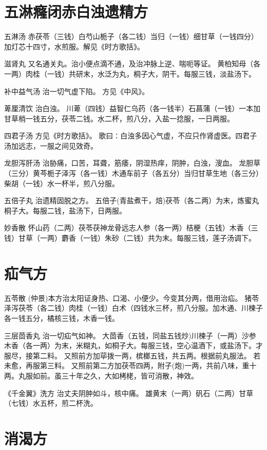 \documentclass[a4paper,12pt,UTF8,twoside]{ctexbook}
\begin{document}
	\chapter{五淋癃闭赤白浊遗精方}
	五淋汤
	赤茯苓（三钱）白芍山栀子（各二钱）当归（一钱）细甘草（一钱四分）加灯芯十四寸，水煎服。解见《时方歌括》。
	
	滋肾丸
	又名通关丸。治小便点滴不通，及治冲脉上逆、喘呃等证。
	黄柏知母（各一两）肉桂（一钱）共研末，水泛为丸，桐子大，阴干。每服三钱，淡盐汤下。
	
	补中益气汤
	治一切气虚下陷。
	方见《中风》。
	
	萆厘清饮
	治白浊。
	川萆（四钱）益智仁乌药（各一钱半）石菖蒲（一钱）一本加甘草梢一钱五分，茯苓二钱。水二杯，煎八分，入盐一捻服，一日两服。
	
	四君子汤
	方见《时方歌括》。
	歌曰∶白浊多因心气虚，不应只作肾虚医。四君子汤加远志，一服之间见效奇。
	
	龙胆泻肝汤
	治胁痛，口苦，耳聋，筋痿，阴湿热痒，阴肿，白浊，溲血。
	龙胆草（三分）黄芩栀子泽泻（各一钱）木通车前子（各五分）当归甘草生地（各三分）柴胡（一钱）水一杯半，煎八分服。
	
	五倍子丸
	治遗精固脱之方。
	五倍子(青盐煮干，焙)茯苓（各二两）为末，炼蜜丸桐子大。每服二钱，盐汤下，日两服。
	
	妙香散
	怀山药（二两）茯苓茯神龙骨远志人参（各一两）桔梗（五钱）木香（三钱）甘草（一两）麝香（一钱）朱砂（二钱）共为末。每服三钱，莲子汤调下。
	
	
	
	\chapter{疝气方}	
	
	五苓散
	(仲景)本方治太阳证身热、口渴、小便少。今变其分两，借用治疝。
	猪苓泽泻茯苓（各二钱）肉桂（一钱）白术（四钱水三杯，煎八分服。加木通、川楝子各一钱五分，橘核三钱，木香一钱。
	
	三层茴香丸
	治一切疝气如神。
	大茴香（五钱，同盐五钱炒)川楝子（一两）沙参木香（各一两）为末，米糊丸，如桐子大。每服三钱，空心温酒下，或盐汤下。才服尽，接第二料。
	又照前方加荜拨一两，槟榔五钱，共五两。根据前丸服法。
	若未愈，再服第三料。
	又照前第二方加茯苓四两，附子(炮)一两，共前八味，重十两。丸服如前。虽三十年之久，大如栲栳，皆可消散，神效。
	
	《千金翼》洗方
	治丈夫阴肿如斗，核中痛。
	雄黄末（一两）矾石（二两）甘草（七钱）水五杯，煎二杯洗。
	
	

	\chapter{消渴方}
		
\end{document}
